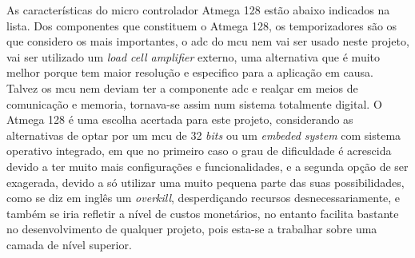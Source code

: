 \newpage
As características do micro controlador Atmega 128 estão abaixo indicados na lista. Dos componentes que constituem o Atmega 128, os temporizadores são os que considero os mais importantes, o \ac{adc} do \acs{mcu} nem vai ser usado neste projeto, vai ser utilizado um \textit{load cell amplifier} externo, uma alternativa que é muito melhor porque tem maior resolução e especifico para a aplicação em causa.
\\ 
Talvez os \acs{mcu} nem deviam ter a componente \acs{adc} e realçar em meios de comunicação e memoria, tornava-se assim num sistema totalmente digital.
O Atmega 128 é uma escolha acertada para este projeto, considerando as alternativas de optar por um \ac{mcu} de 32 \textit{bits} ou um \textit{embeded system} com sistema operativo integrado, em que no primeiro caso o grau de dificuldade é acrescida devido a ter muito mais configurações e funcionalidades, e a segunda opção de ser exagerada, devido a só utilizar uma muito pequena parte das suas possibilidades, como se diz em inglês um \textit{overkill}, desperdiçando recursos desnecessariamente, e também se iria refletir a nível de custos monetários, no entanto facilita bastante no desenvolvimento de qualquer projeto, pois esta-se a trabalhar sobre uma camada de nível superior.
\\
\\

